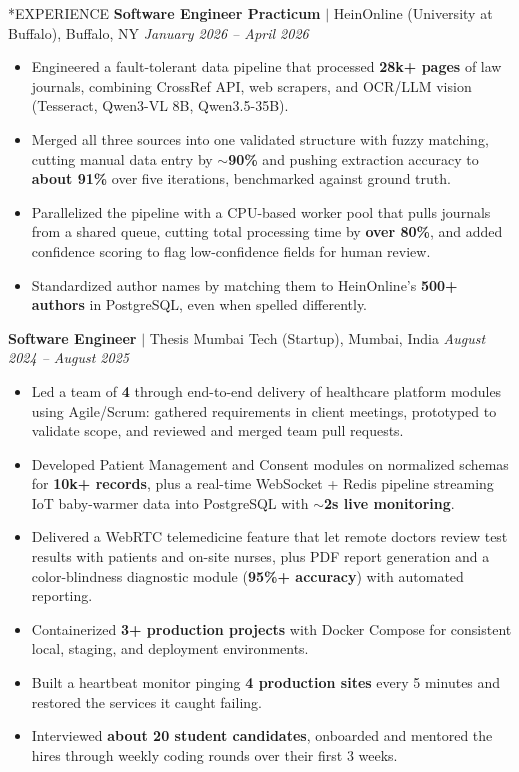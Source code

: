\documentclass[10pt, letterpaper]{article}
\makeatletter
\newcommand{\rolegap}{\vspace{6.6pt}}
\renewcommand{\section}{\@startsection{section}{1}{\z@}{-0.46em \@plus -0.1ex \@minus -0.1ex}{0.36ex \@plus 0.1ex}{\normalfont\large\bfseries}}
\makeatother
\begin{document}
\section*{EXPERIENCE}
\noindent\textbf{Software Engineer Practicum} $|$ HeinOnline (University at Buffalo), Buffalo, NY \hfill \textit{January 2026 -- April 2026}
\begin{itemize}\setlength{\itemsep}{0.78pt}
\item Engineered a fault-tolerant data pipeline that processed \textbf{28k+ pages} of law journals, combining CrossRef API, web scrapers, and OCR/LLM vision (Tesseract, Qwen3-VL 8B, Qwen3.5-35B).
\item Merged all three sources into one validated structure with fuzzy matching, cutting manual data entry by \textbf{$\sim$90\%} and pushing extraction accuracy to \textbf{about 91\%} over five iterations, benchmarked against ground truth.
\item Parallelized the pipeline with a CPU-based worker pool that pulls journals from a shared queue, cutting total processing time by \textbf{over 80\%}, and added confidence scoring to flag low-confidence fields for human review.
\item Standardized author names by matching them to HeinOnline's \textbf{500+ authors} in PostgreSQL, even when spelled differently.
\end{itemize}
\rolegap
\noindent\textbf{Software Engineer} $|$ Thesis Mumbai Tech (Startup), Mumbai, India \hfill \textit{August 2024 -- August 2025}
\begin{itemize}\setlength{\itemsep}{0.78pt}
\item Led a team of \textbf{4} through end-to-end delivery of healthcare platform modules using Agile/Scrum: gathered requirements in client meetings, prototyped to validate scope, and reviewed and merged team pull requests.
\item Developed Patient Management and Consent modules on normalized schemas for \textbf{10k+ records}, plus a real-time WebSocket + Redis pipeline streaming IoT baby-warmer data into PostgreSQL with \textbf{$\sim$2s live monitoring}.
\item Delivered a WebRTC telemedicine feature that let remote doctors review test results with patients and on-site nurses, plus PDF report generation and a color-blindness diagnostic module (\textbf{95\%+ accuracy}) with automated reporting.
\item Containerized \textbf{3+ production projects} with Docker Compose for consistent local, staging, and deployment environments.
\item Built a heartbeat monitor pinging \textbf{4 production sites} every 5 minutes and restored the services it caught failing.
\item Interviewed \textbf{about 20 student candidates}, onboarded and mentored the hires through weekly coding rounds over their first 3 weeks.
\end{itemize}
\end{document}
